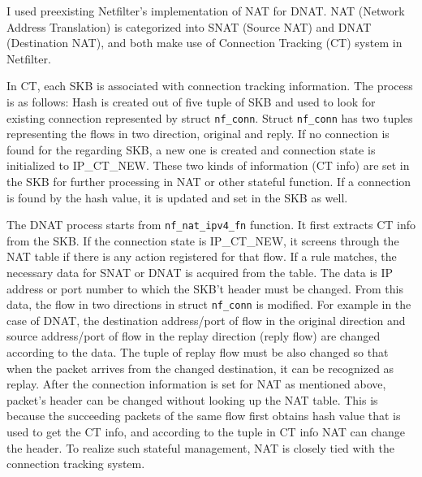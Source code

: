 I used preexisting Netfilter's implementation of NAT for DNAT. NAT (Network Address Translation) is categorized into SNAT (Source NAT) and DNAT (Destination NAT), and both make use of Connection Tracking (CT) system in Netfilter. 

In CT, each SKB is associated with connection tracking information. The process is as follows: Hash is created out of five tuple of SKB and used to look for existing connection represented by struct {\tt nf\_conn}. Struct {\tt nf\_conn} has two tuples representing the flows in two direction, original and reply. If no connection is found for the regarding SKB, a new one is created and connection state is initialized to IP\_CT\_NEW. These two kinds of information (CT info) are set in the SKB for further processing in NAT or other stateful function. If a connection is found by the hash value, it is updated and set in the SKB as well. 

The DNAT process starts from {\tt nf\_nat\_ipv4\_fn} function. It first extracts CT info from the SKB. If the connection state is IP\_CT\_NEW, it screens through the NAT table if there is any action registered for that flow. If a rule matches, the necessary data for SNAT or DNAT is acquired from the table. The data is IP address or port number to which the SKB't header must be changed. From this data, the flow in two directions in struct {\tt nf\_conn} is modified. For example in the case of DNAT, the destination address/port of flow in the original direction and source address/port of flow in the replay direction (reply flow) are changed according to the data. The tuple of replay flow  must be also changed so that when the packet arrives from the changed destination, it can be recognized as replay. After the connection information is set for NAT as mentioned above, packet's header can be changed without looking up the NAT table. This is because the succeeding packets of the same flow first obtains hash value that is used to get the CT info, and according to the tuple in CT info NAT can change the header. To realize such stateful management, NAT is closely tied with the connection tracking system. 



















